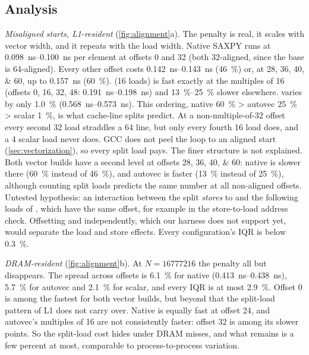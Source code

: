 \subsection{Analysis}
\emph{Misaligned starts, L1-resident} (\cref{fig:alignment}a). The penalty is real, it scales with
vector width, and it repeats with the load width. Native SAXPY runs at
\qtyrange{0.098}{0.100}{\nano\second} per element at offsets $0$ and \qty{32}{\byte} (both
\qty{32}{\byte}-aligned, since the base is \qty{64}{\byte}-aligned). Every other offset costs
\qtyrange{0.142}{0.143}{\nano\second} (\SI{+46}{\percent}) or, at \numlist{28;36;40;60}, up to
\qty{0.157}{\nano\second} (\SI{+60}{\percent}).  (\qty{16}{\byte} loads) is fast
exactly at the multiples of \num{16} (offsets $0$, \num{16}, \num{32}, \num{48}:
\qtyrange{0.191}{0.198}{\nano\second}) and \SIrange{13}{25}{\percent} slower elsewhere.
 varies by only \SI{1.0}{\percent} (\qtyrange{0.568}{0.573}{\nano\second}). This
ordering, native \SI{60}{\percent} > autovec \SI{25}{\percent} > scalar \SI{1}{\percent}, is what
cache-line splits predict. At a non-multiple-of-32 offset every second \qty{32}{\byte} load
straddles a \qty{64}{\byte} line, but only every fourth \qty{16}{\byte} load does, and a
\qty{4}{\byte} scalar load never does. GCC does not peel the loop to an aligned start
(\cref{sec:vectorization}), so every split load pays. The finer structure is not explained. Both vector builds have a
second level at offsets \numlist{28;36;40;60}: native is slower there (\SI{+60}{\percent} instead
of \SI{+46}{\percent}), and autovec is faster (\SI{+13}{\percent} instead of \SI{+25}{\percent}),
although counting split loads predicts the same number at all non-aligned offsets. Untested
hypothesis: an interaction between the split \emph{stores} to  and the following loads of
, which have the same offset, for example in the store-to-load address check. Offsetting
 and  independently, which our harness does not support yet, would separate the
load and store effects. Every configuration's IQR is below
\SI{0.3}{\percent}.

\emph{DRAM-resident} (\cref{fig:alignment}b). At $N=\num{16777216}$ the penalty all but disappears.
The spread across offsets is \SI{6.1}{\percent} for native (\qtyrange{0.413}{0.438}{\nano\second}),
\SI{5.7}{\percent} for autovec and \SI{2.1}{\percent} for scalar, and every IQR is at most
\SI{2.9}{\percent}. Offset $0$ is among the fastest for both vector builds, but beyond that the
split-load pattern of L1 does not carry over. Native is equally fast at offset \num{24}, and
autovec's multiples of \num{16} are not consistently faster: offset \num{32} is among its slower
points. So the split-load cost hides under DRAM misses, and what remains is a few percent at most,
comparable to process-to-process variation.

